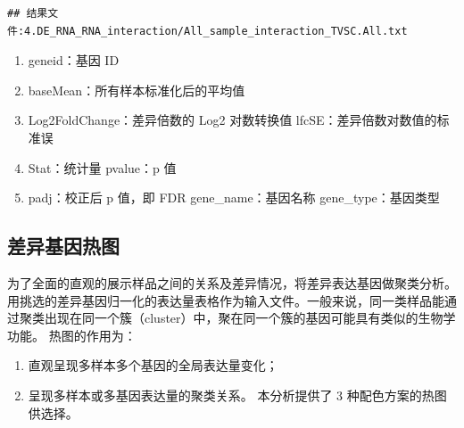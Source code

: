 \documentclass[
]{ctexart}
\providecommand{\tightlist}{%
  \setlength{\itemsep}{0pt}\setlength{\parskip}{0pt}}
\begin{document}
\begin{verbatim}
## 结果文件:4.DE_RNA_RNA_interaction/All_sample_interaction_TVSC.All.txt
\end{verbatim}

\begin{table}[H]

\caption{\label{tab:unnamed-chunk-8}数据比对统计表}
\centering
{}
\end{table}

\begin{enumerate}
\def\labelenumi{(\arabic{enumi})}
\tightlist
\item
  geneid：基因 ID
\item
  baseMean：所有样本标准化后的平均值
\item
  Log2FoldChange：差异倍数的 Log2 对数转换值 lfcSE：差异倍数对数值的标准误
\item
  Stat：统计量 pvalue：p 值
\item
  padj：校正后 p 值，即 FDR gene\_name：基因名称 gene\_type：基因类型
\end{enumerate}

\hypertarget{ux5deeux5f02ux57faux56e0ux70edux56fe}{%
\subsection{差异基因热图}\label{ux5deeux5f02ux57faux56e0ux70edux56fe}}

为了全面的直观的展示样品之间的关系及差异情况，将差异表达基因做聚类分析。用挑选的差异基因归一化的表达量表格作为输入文件。一般来说，同一类样品能通过聚类出现在同一个簇（cluster）中，聚在同一个簇的基因可能具有类似的生物学功能。
热图的作用为：

\begin{enumerate}
\def\labelenumi{(\arabic{enumi})}
\tightlist
\item
  直观呈现多样本多个基因的全局表达量变化；
\item
  呈现多样本或多基因表达量的聚类关系。
  本分析提供了 3 种配色方案的热图供选择。
\end{enumerate}
\end{document}
